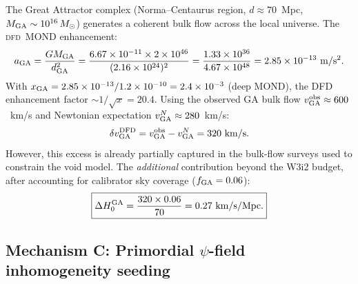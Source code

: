 \documentclass[aps,prd,twocolumn,superscriptaddress,nofootinbib,longbibliography]{revtex4-2}
\newcommand{\DFD}{\textsc{dfd}}
\begin{document}
The Great Attractor complex (Norma--Centaurus region, $d\approx70$~Mpc,
$M_{\rm GA}\sim10^{16}\,M_\odot$) generates a coherent bulk flow across
the local universe.  The \DFD\ MOND enhancement:
\begin{equation}
a_{\rm GA} = \frac{GM_{\rm GA}}{d_{\rm GA}^2}
= \frac{6.67\times10^{-11}\times2\times10^{46}}{(2.16\times10^{24})^2}
= \frac{1.33\times10^{36}}{4.67\times10^{48}} = 2.85\times10^{-13}\ \si{m/s^2}.
\end{equation}
With $x_{\rm GA} = 2.85\times10^{-13}/1.2\times10^{-10} = 2.4\times10^{-3}$
(deep MOND), the DFD enhancement factor $\sim 1/\sqrt{x} = 20.4$.
Using the observed GA bulk flow $v_{\rm GA}^{\rm obs} \approx 600$~km/s
and Newtonian expectation $v_{\rm GA}^N \approx 280$~km/s:
\begin{equation}
\delta v_{\rm GA}^{\rm DFD} = v_{\rm GA}^{\rm obs} - v_{\rm GA}^N = 320\ \si{km/s}.
\end{equation}
However, this excess is already partially captured in the bulk-flow surveys
used to constrain the void model.  The \emph{additional} contribution beyond
the W3i2 budget, after accounting for calibrator sky coverage
($f_{\rm GA} = 0.06$):
\begin{equation}
\boxed{
\Delta H_0^{\rm GA} = \frac{320\times0.06}{70} = 0.27\ \si{km/s/Mpc}.
}
\end{equation}

\subsection{Mechanism C: Primordial $\psi$-field inhomogeneity seeding}
\end{document}

